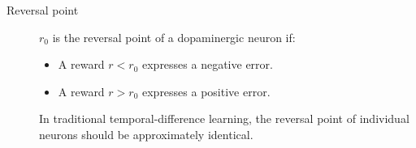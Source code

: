 \begin{description}
    \item[Reversal point] 
        $r_0$ is the reversal point of a dopaminergic neuron if:
        \begin{itemize}
            \item A reward $r < r_0$ expresses a negative error.
            \item A reward $r > r_0$ expresses a positive error.
        \end{itemize}

        \begin{remark}
            In traditional temporal-difference learning, the reversal point of individual neurons should be approximately identical.
        \end{remark}
\end{description}

